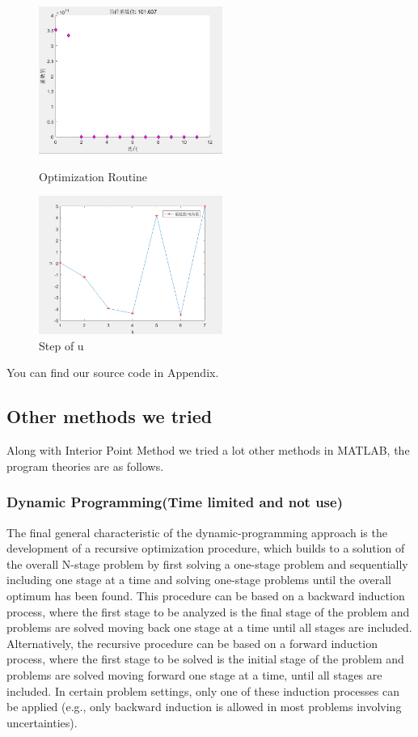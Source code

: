 \documentclass{mcmthesis}
\begin{document}
\begin{figure}[H]
\centering
\begin{minipage}[t]{0.48\textwidth}
\centering
\includegraphics[width=6cm]{Optimal Control of a Linear Discrete System/MCM20200128/picture/第二问.png}
\caption{Optimization Routine}
\end{minipage}
\begin{minipage}[t]{0.48\textwidth}
\centering
\includegraphics[width=6cm]{Optimal Control of a Linear Discrete System/MCM20200128/picture/第二问2.png}
\caption{Step of u}
\end{minipage}
\end{figure}

You can find our source code in Appendix. 

\subsection{Other methods we tried}

Along with Interior Point Method we tried a lot other methods in MATLAB, the program theories are as follows.

\subsubsection{Dynamic Programming(Time limited and not use)}
The final general characteristic of the dynamic-programming approach is the development of a recursive optimization procedure, which builds to a solution of the overall N-stage problem by first solving a one-stage problem and sequentially including one stage at a time and solving one-stage problems until the overall optimum has been found. This procedure can be based on a backward induction process, where the first stage to be analyzed is the final stage of the problem and problems are solved moving back one stage at a time until all stages are included. Alternatively, the recursive procedure can be based on a forward induction process, where the first stage to be solved is the initial stage of the problem and problems are solved moving forward
one stage at a time, until all stages are included. In certain problem settings, only one of these induction processes can be applied (e.g., only backward induction is allowed in most problems involving uncertainties).
\end{document}
